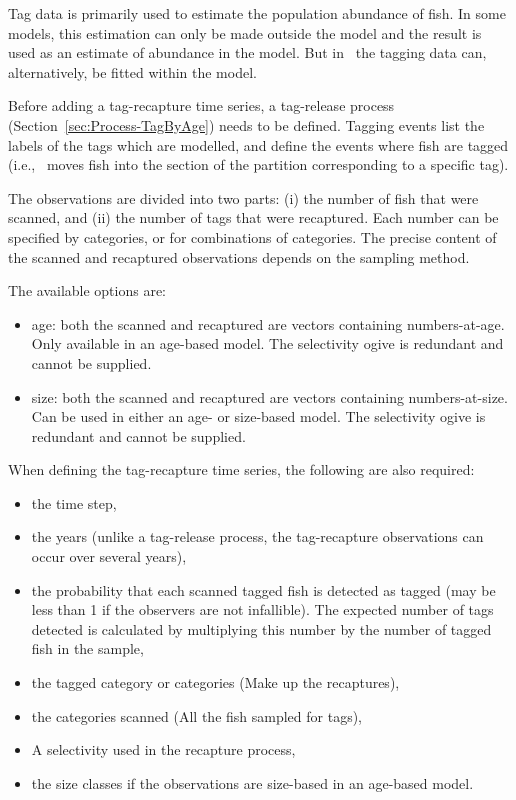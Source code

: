 Tag data is primarily used to estimate the population abundance of fish. In some models, this estimation can only be made outside the model and the result is used as an estimate of abundance in the model. But in \CNAME\ the tagging data can, alternatively, be fitted within the model.

Before adding a tag-recapture time series, a tag-release process (Section~\ref{sec:Process-TagByAge}) needs to be defined. Tagging events list the labels of the tags which are modelled, and define the events where fish are tagged (i.e., \CNAME\ moves fish into the section of the partition corresponding to a specific tag).

The observations are divided into two parts: (i) the number of fish that were scanned, and (ii) the number of tags that were recaptured. Each number can be specified by categories, or for combinations of categories. The precise content of the scanned and recaptured observations depends on the sampling method.

The available options are:

\begin{itemize}
	\item age: both the scanned and recaptured are vectors containing numbers-at-age. Only available in an age-based model. The selectivity ogive is redundant and cannot be supplied.
	\item size: both the scanned and recaptured are vectors containing numbers-at-size. Can be used in either an age- or size-based model. The selectivity ogive is redundant and cannot be supplied.
\end{itemize}

When defining the tag-recapture time series, the following are also required:

\begin{itemize}
	\item the time step,
	\item the years (unlike a tag-release process, the tag-recapture observations can occur over several years),
	\item the probability that each scanned tagged fish is detected as tagged (may be less than 1 if the observers are not infallible). The expected number of tags detected is calculated by multiplying this number by the number of tagged fish in the sample,
	\item the tagged category or categories (Make up the recaptures),
	\item the categories scanned (All the fish sampled for tags),
	\item A selectivity used in the recapture process,
	\item the size classes if the observations are size-based in an age-based model.
\end{itemize}


